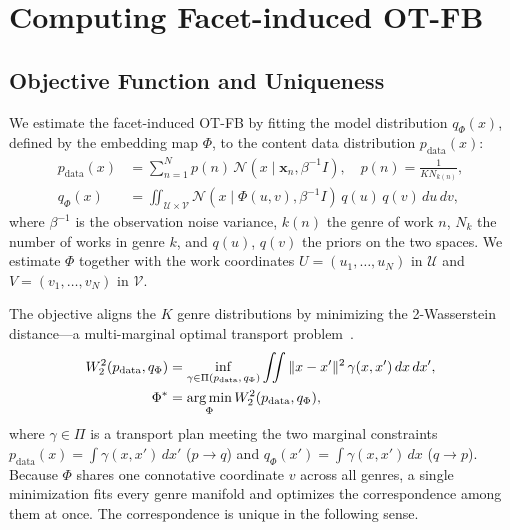 \section{Computing Facet-induced OT-FB}\label{sec:computation}

\subsection{Objective Function and Uniqueness}

We estimate the facet-induced OT-FB by fitting the model distribution
$q_\Phi(x)$, defined by the embedding map $\Phi$, to the content data
distribution $p_\text{data}(x)$:
\begin{align*}
    p_{\text{data}}(x) & = \sum_{n=1}^N p(n)\,
    \mathcal{N}(x \mid \mathbf{x}_n, \beta^{-1}I), \quad
    p(n) = \frac{1}{K N_{k(n)}},                                \\
    q_\Phi(x)          & = \iint_{\mathcal{U}\times\mathcal{V}}
    \mathcal{N}(x \mid \Phi(u, v), \beta^{-1}I)\, q(u)\, q(v)\, du\, dv,
\end{align*}
where $\beta^{-1}$ is the observation noise variance, $k(n)$ the genre
of work $n$, $N_k$ the number of works in genre $k$, and $q(u)$,
$q(v)$ the priors on the two spaces. We estimate $\Phi$ together with
the work coordinates $U = (u_1, \dots, u_N)$ in $\mathcal{U}$ and
$V = (v_1, \dots, v_N)$ in $\mathcal{V}$.

The objective aligns the $K$ genre distributions by minimizing the
2-Wasserstein distance---a multi-marginal optimal transport
problem~\citep{Pass20151771}.
\begin{equation}\label{eq:main_objective}
    \begin{aligned}
        W^2_2(p_\text{data}, q_\Phi)
               & = \inf_{\gamma\in\Pi(p_{\text{data}},\, q_\Phi)}
        \iint \|x - x'\|^2\, \gamma(x, x')\, dx\, dx',            \\
        \Phi^* & = \operatorname*{arg\,min}_{\Phi} W^2_2(p_\text{data}, q_\Phi),
    \end{aligned}
\end{equation}
where $\gamma \in \Pi$ is a transport plan meeting the two marginal
constraints $p_{\text{data}}(x) = \int \gamma(x,x')\,dx'$
($p \rightarrow q$) and $q_\Phi(x') = \int \gamma(x,x')\,dx$
($q \rightarrow p$). Because $\Phi$ shares one connotative coordinate
$v$ across all genres, a single minimization fits every genre manifold
and optimizes the correspondence among them at once. The
correspondence is unique in the following sense.

